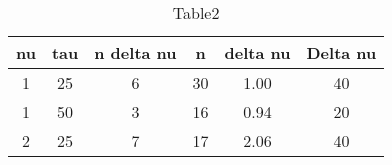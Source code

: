 \begin{table} 
 \caption{Table2}
\begin{tabular}{|*{6}{c|}}
\hline 
nu & tau & n delta nu & n & delta nu & Delta nu\\ \hline 
1 & 25 & 6 & 30 & 1.00 & 40 \\ \hline 
 1 & 50 & 3 & 16 & 0.94 & 20 \\ \hline 
 2 & 25 & 7 & 17 & 2.06 & 40 \\ \hline 
 \end{tabular} 
\end{table} 
